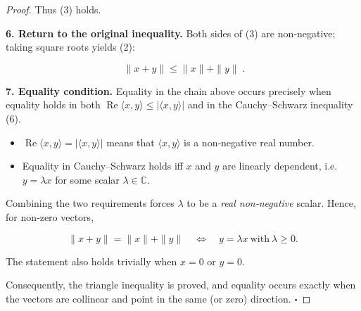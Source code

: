 \begin{proof}
Thus (3) holds.

\medskip
\noindent\textbf{6.  Return to the original inequality.}
Both sides of (3) are non‑negative; taking square roots yields (2):

\[
\boxed{\;\|x+y\|\le \|x\|+\|y\|\;}.
\]

\medskip
\noindent\textbf{7.  Equality condition.}
Equality in the chain above occurs precisely when equality holds in both
\(\operatorname{Re}\langle x,y\rangle\le |\langle x,y\rangle|\) and in the
Cauchy–Schwarz inequality (6).

\begin{itemize}
\item \(\operatorname{Re}\langle x,y\rangle = |\langle x,y\rangle|\) means that
\(\langle x,y\rangle\) is a non‑negative real number.
\item Equality in Cauchy–Schwarz holds iff \(x\) and \(y\) are linearly dependent,
i.e. \(y=\lambda x\) for some scalar \(\lambda\in\mathbb{C}\).
\end{itemize}
Combining the two requirements forces \(\lambda\) to be a \emph{real non‑negative}
scalar. Hence, for non‑zero vectors,

\[
\|x+y\| = \|x\|+\|y\|\quad\Longleftrightarrow\quad y=\lambda x\ \text{with}\ \lambda\ge 0.
\]

The statement also holds trivially when \(x=0\) or \(y=0\).

Consequently, the triangle inequality is proved, and equality occurs exactly
when the vectors are collinear and point in the same (or zero) direction. \(\square\)
\end{proof}